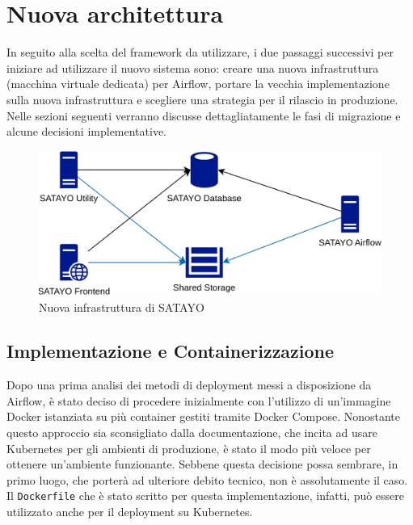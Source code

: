 \chapter{Nuova architettura}
\label{cha:nuova_architettura}

In seguito alla scelta del framework da utilizzare, i due passaggi successivi per
iniziare ad utilizzare il nuovo sistema sono: creare una nuova infrastruttura (macchina
virtuale dedicata) per Airflow, portare la vecchia implementazione sulla nuova infrastruttura
e scegliere una strategia per il rilascio in produzione. Nelle sezioni seguenti
verranno discusse dettagliatamente le fasi di migrazione e alcune decisioni
implementative.

\begin{figure}[htbp]
  \centering
  \includegraphics[width=.6\linewidth]{images/SATAYO_infrastructure_new.png}
  \caption{Nuova infrastruttura di SATAYO}
  \label{fig:infra_new}
\end{figure}

\section{Implementazione e Containerizzazione}
\label{sec:impl_container}

Dopo una prima analisi dei metodi di deployment messi a disposizione da Airflow,
è stato deciso di procedere inizialmente con l'utilizzo di un'immagine Docker\cite{docker}
istanziata su più container gestiti tramite Docker Compose. Nonostante questo approccio
sia sconsigliato dalla documentazione, che incita ad usare Kubernetes per gli
ambienti di produzione, è stato il modo più veloce per ottenere un'ambiente funzionante.
Sebbene questa decisione possa sembrare, in primo luogo, che porterà ad
ulteriore debito tecnico, non è assolutamente il caso. Il \texttt{Dockerfile} che
è stato scritto per questa implementazione, infatti, può essere utilizzato anche
per il deployment su Kubernetes.

